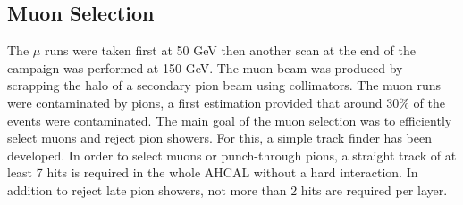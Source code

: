\documentclass[twoside,a4paper,11pt]{article}
\begin{document}
\subsection{Muon Selection}
The $\mu$ runs were taken first at 50 GeV then another scan at the end of the campaign was performed at 150 GeV. The muon beam was produced by scrapping the halo of a secondary pion beam using collimators. The muon runs were contaminated by pions, a first estimation provided that around 30\% of the events were contaminated. The main goal of the muon selection was to efficiently select muons and reject pion showers. For this, a simple track finder has been developed. In order to select muons or punch-through pions, a straight track of at least 7 hits is required in the whole AHCAL without a hard interaction. In addition to reject late pion showers, not more than 2 hits are required per layer.
\begin{table}[htbp]
\centering
{}
  \caption{Selection cuts for muon runs.}
  \label{table:muon_sel}
\end{table}
\end{document}
